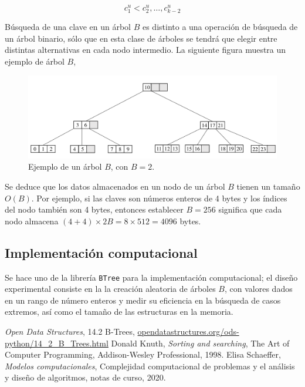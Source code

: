 \documentclass[letterpaper,11pt]{article}
\begin{document}
\begin{equation}
	c^u_1 < c^u_2,\dots,c^u_{k-2}
\end{equation}

Búsqueda de una clave en un árbol $B$ es distinto a una operación de búsqueda de un árbol binario, sólo que en esta clase de árboles se tendrá que elegir entre distintas alternativas en cada nodo intermedio. La siguiente figura muestra un ejemplo de árbol $B$,

\begin{figure}[h!]
  \centering
  \includegraphics[width=\textwidth]{img/btree.pdf}
  \caption{Ejemplo de un árbol $B$, con $B=2$.}
  \label{fig:ie}
\end{figure}

Se deduce que los datos almacenados en un nodo de un árbol $B$ tienen un tamaño $O(B)$. Por ejemplo, si las claves son números enteros de 4 bytes y los índices del nodo también son 4 bytes, entonces establecer $ B=256 $ significa que cada nodo almacena $\displaystyle (4+4)\times 2B= 8\times512=4096$ bytes.

\subsection{Implementación computacional}

Se hace uno de la librería \texttt{BTree} para la implementación computacional; el diseño experimental consiste en la la creación aleatoria de árboles $B$, con valores dados en un rango de número enteros y medir su eficiencia en la búsqueda de casos extremos, así como el tamaño de las estructuras en la memoria.


\begin{thebibliography}{0}
  \textit{Open Data Structures}, 14.2 B-Trees, \url{opendatastructures.org/ods-python/14_2_B_Trees.html}
   Donald Knuth, \textit{Sorting and searching}, The Art of Computer Programming, Addison-Wesley Professional, 1998.
   Elisa Schaeffer, \textit{Modelos computacionales}, Complejidad computacional de problemas y el análisis y diseño de algoritmos, notas de curso, 2020.
\end{thebibliography}
\end{document}
